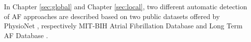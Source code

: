 In Chapter \ref{sec:global} and Chapter \ref{sec:local}, two different automatic detection of AF approaches are described based on two public datasets offered by PhysioNet \cite{physionet}, respectively MIT-BIH Atrial Fibrillation Database \cite{afdb} and Long Term AF Database \cite{ltafdb}.
\clearpage

